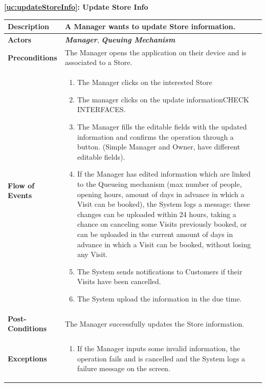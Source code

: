 \documentclass[a4paper, 10pt, oneside]{article}
\newcommand*{\lorenzo}[1]{\textcolor{BurntOrange}{#1}}
\begin{document}
\begin{center}
{\textbf{\ref{uc:updateStoreInfo}: Update Store Info}}
\end{center}
\begin{tabularx}{\linewidth}{| l | X |}
	
	\hline
	\textbf{Description} & A Manager wants to update Store information.\\
	

	\hline
	\textbf{Actors} & \textbf{\textit{Manager}}, \textit{\textbf{Queuing Mechanism}}\\
	
	\hline
	\textbf{Preconditions} & The Manager opens the application on their device and is associated to a Store.\\
	
	\hline
	\textbf{Flow of Events} & \parbox{0.7\textwidth}{	
		\begin{enumerate}
			\item The Manager clicks on the interested Store
			\item The manager clicks on the update information\lorenzo{CHECK INTERFACES}.
			\item The Manager fills the editable fields with the updated information and confirms the operation through a button. (Simple Manager and Owner, have different editable fields).
			\item If the Manager has edited information which are linked to the Queueing mechanism (max number of people, opening hours, amount of days in advance in which a Visit can be booked), the System logs a message: these changes can be uploaded within 24 hours, taking a chance on canceling some Visits previously booked, or can be uploaded in the current amount of days in advance in which a Visit can be booked, without losing any Visit.
			\item The System sends notifications to Customers if their Visits have been cancelled.
			\item The System upload the information in the due time.
	\end{enumerate}}\\
	
	\hline
	\textbf{Post-Conditions} & The Manager successfully updates the Store information.\\
	
	\hline
	\textbf{Exceptions} & \parbox{0.7\textwidth}{ \begin{enumerate}
			\item If the Manager inputs some invalid information, the operation fails and is cancelled and the System logs a failure message on the screen.
		\end{enumerate}}\\

	\hline
	
\end{tabularx}
\end{document}
